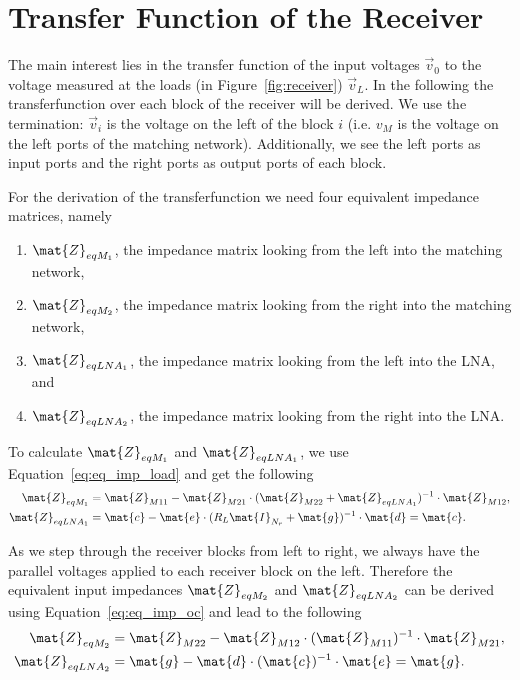 \section{Transfer Function of the Receiver}
\label{sec:transf}
The main interest lies in the transfer function of the input voltages $\vec{v}_0$ to the voltage measured at the loads (in Figure~\ref{fig:receiver}) $\vec{v}_L$.
In the following the transferfunction over each block of the receiver will be derived.
We use the termination: $\vec{v}_i$ is the voltage on the left of the block $i$ (i.e. $v_{M}$ is the voltage on the left ports of the matching network).
Additionally, we see the left ports as input ports and the right ports as output ports of each block.

For the derivation of the transferfunction we need four equivalent impedance matrices, namely
\begin{enumerate}
\item{$\mat{Z}_{eqM_1}$, the impedance matrix looking from the left into the matching network,}
\item{$\mat{Z}_{eqM_2}$, the impedance matrix looking from the right into the matching network,}
\item{$\mat{Z}_{eqLNA_1}$, the impedance matrix looking from the left into the LNA, and}
\item{$\mat{Z}_{eqLNA_2}$, the impedance matrix looking from the right into the LNA.}
\end{enumerate}

To calculate $\mat{Z}_{eqM_1}$ and $\mat{Z}_{eqLNA_1}$, we use Equation~\eqref{eq:eq_imp_load} and get the following
\begin{align}
\label{eq:zeqm1}
\mat{Z}_{eqM_1} &= \mat{Z}_{M11} - \mat{Z}_{M21}\cdot(\mat{Z}_{M22} + \mat{Z}_{eqLNA_1})^{-1}\cdot\mat{Z}_{M12},\\
\label{eq:zeqlna1}
\mat{Z}_{eqLNA_1} &= \mat{c} - \mat{e}\cdot(R_L\mat{I}_{N_r} + \mat{g})^{-1}\cdot\mat{d} = \mat{c}.
\end{align}

As we step through the receiver blocks from left to right, we always have the parallel voltages applied to each receiver block on the left.
Therefore the equivalent input impedances $\mat{Z}_{eqM_2}$ and $\mat{Z}_{eqLNA_2}$ can be derived using Equation~\eqref{eq:eq_imp_oc} and lead to the following
\begin{align}
\label{eq:zeqm2}
\mat{Z}_{eqM_2} &= \mat{Z}_{M22} - \mat{Z}_{M12}\cdot(\mat{Z}_{M11})^{-1}\cdot\mat{Z}_{M21},\\
\label{eq:zeqlna2}
\mat{Z}_{eqLNA_2} &= \mat{g} - \mat{d}\cdot(\mat{c})^{-1}\cdot\mat{e} = \mat{g}.
\end{align}

